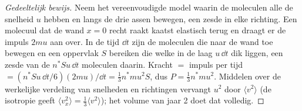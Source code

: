 \begin{proof}[Gedeeltelijk bewijs]
Neem het vereenvoudigde model waarin de moleculen alle de snelheid $u$ hebben en
langs de drie assen bewegen, een zesde in elke richting. Een molecuul
dat de wand $x = 0$ recht raakt kaatst elastisch terug en draagt er
de impuls $2mu$ aan over. In de tijd $\dd t$ zijn de moleculen die naar de
wand toe bewegen en een oppervlak $S$ bereiken die welke in de laag $u\,\dd t$
dik liggen, een zesde van de $n^*Su\,\dd t$ moleculen daarin. Kracht $= $
impuls per tijd $= (n^*Su\,\dd t/6)(2mu)/\dd t = \tfrac13 n^*mu^2S$, dus
$P = \tfrac13 n^*mu^2$. Middelen over de werkelijke verdeling van snelheden
en richtingen vervangt $u^2$ door $\langle v^2\rangle$ (de isotropie geeft
$\langle v_x^2\rangle = \tfrac13\langle v^2\rangle$); het volume van jaar 2 doet
dat volledig.
\end{proof}

